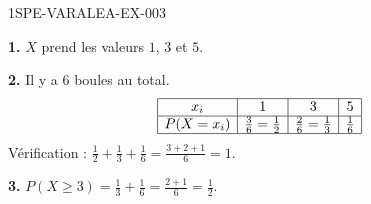 \begin{corrige}{1SPE-VARALEA-EX-003}

\textbf{1.} $X$ prend les valeurs $1$, $3$ et $5$.

\medskip
\textbf{2.} Il y a $6$ boules au total.
\[
\begin{array}{|c|c|c|c|}
\hline
x_i & 1 & 3 & 5 \\
\hline
P(X=x_i) & \frac{3}{6} = \frac{1}{2} & \frac{2}{6} = \frac{1}{3} & \frac{1}{6} \\
\hline
\end{array}
\]
Vérification : $\frac{1}{2} + \frac{1}{3} + \frac{1}{6} = \frac{3+2+1}{6} = 1$. \checkmark

\medskip
\textbf{3.} $P(X \geq 3) = \frac{1}{3} + \frac{1}{6} = \frac{2+1}{6} = \frac{1}{2}$.

\end{corrige}
